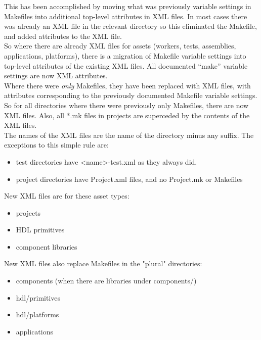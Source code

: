 This has been accomplished by moving what was previously variable settings in Makefiles into additional top-level attributes in XML files.  In most cases there was already an XML file in the relevant directory so this eliminated the Makefile, and added attributes to the XML file.\\

So where there are already XML files for assets (workers, tests, assemblies, applications, platforms), there is a migration of Makefile variable settings into top-level attributes of the existing XML files.  All documented ``make'' variable settings are now XML attributes.\\

Where there were \textit{only} Makefiles, they have been replaced with XML files, with attributes corresponding to the previously documented Makefile variable settings.\\

So for all directories where there were previously only Makefiles, there are now XML files.  Also, all *.mk files in projects are superceded by the contents of the XML files.\\

The names of the XML files are the name of the directory minus any suffix.  The exceptions to this simple rule are:
\begin{itemize}
\setlength\itemsep{0em} %
\item test directories have \textless name\textgreater -test.xml as they always did.
\item project directories have Project.xml files, and no Project.mk or Makefiles
\end{itemize}

New XML files are for these asset types:
\begin{itemize}
\setlength\itemsep{0em} %
\item projects
\item HDL primitives
\item component libraries
\end{itemize}

New XML files also replace Makefiles in the "plural" directories:
\begin{itemize}
\setlength\itemsep{0em} %
\item components (when there are libraries under components/)
\item hdl/primitives
\item hdl/platforms
\item applications
\end{itemize}

